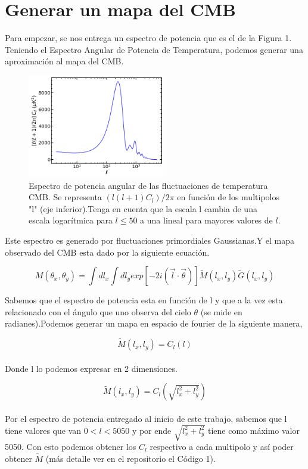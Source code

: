 \documentclass[a4paper]{article}
\begin{document}
\section{Generar un mapa del CMB}\label{sec:Generar un mapa del CMB}
 
Para empezar, se nos entrega un espectro de potencia que es el de la Figura 1. 
Teniendo el Espectro Angular de Potencia de Temperatura, podemos generar una aproximación al mapa del CMB.\\

\begin{figure}
\centering
\includegraphics[width=6cm]{D_ell.png}
\centering
\caption{Espectro de potencia angular de las fluctuaciones de temperatura CMB. Se representa $(l(l+1)C_l)/2\pi$  en función de los multipolos "l" (eje inferior).Tenga en cuenta que la escala l cambia de una escala logarítmica para $l\leq 50 $ a una lineal para mayores valores de $l$.}
\end{figure}

Este espectro es generado por fluctuaciones primordiales Gaussianas.Y el mapa observado del CMB esta dado por la siguiente ecuación.

\begin{equation}
    M(\theta_x,\theta_y)=\int dl_x\int dl_y exp[-2i(\vec{l} \cdot \vec{\theta})] \tilde{M}(l_x,l_y)\tilde{G}(l_x,l_y)
\end{equation}

Sabemos que el espectro de potencia esta en función de l y que a la vez esta relacionado con el ángulo que uno observa del cielo $\theta$ (se mide en radianes).Podemos generar un mapa en espacio de fourier de la siguiente manera, 

\begin{equation}
    \tilde{M}(l_x,l_y)=C_l(l)
\end{equation}
\\
Donde l lo podemos expresar en 2 dimensiones.

\begin{equation}
    \tilde{M}(l_x,l_y)=C_l(\sqrt{l_x^2+l_y^2})
\end{equation}
\\
Por el espectro de potencia entregado al inicio de este trabajo, sabemos que l tiene valores que van $0<l<5050$ y por ende $\sqrt{l_x^2+l_y^2}$ tiene como máximo valor 5050. Con esto podemos obtener los $C_l$ respectivo a cada multipolo y así poder obtener $\tilde{M}$ (más detalle ver en el repositorio el Código 1).\\
\end{document}
